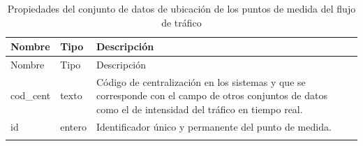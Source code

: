 \documentclass[]{book}
\begin{document}
\begin{longtable}[]{@{}lll@{}}
\caption{\label{tabs:propiedades-datos-localizacion}Propiedades del
conjunto de datos de ubicación de los puntos de medida del flujo de
tráfico}\tabularnewline
\toprule
\begin{minipage}[b]{0.15\columnwidth}\raggedright\strut
Nombre\strut
\end{minipage} & \begin{minipage}[b]{0.11\columnwidth}\raggedright\strut
Tipo\strut
\end{minipage} & \begin{minipage}[b]{0.63\columnwidth}\raggedright\strut
Descripción\strut
\end{minipage}\tabularnewline
\midrule
\endfirsthead
\toprule
\begin{minipage}[b]{0.15\columnwidth}\raggedright\strut
Nombre\strut
\end{minipage} & \begin{minipage}[b]{0.11\columnwidth}\raggedright\strut
Tipo\strut
\end{minipage} & \begin{minipage}[b]{0.63\columnwidth}\raggedright\strut
Descripción\strut
\end{minipage}\tabularnewline
\midrule
\endhead
\begin{minipage}[t]{0.15\columnwidth}\raggedright\strut
cod\_cent\strut
\end{minipage} & \begin{minipage}[t]{0.11\columnwidth}\raggedright\strut
texto\strut
\end{minipage} & \begin{minipage}[t]{0.63\columnwidth}\raggedright\strut
Código de centralización en los sistemas y que se corresponde con el
campo de otros conjuntos de datos como el de intensidad del tráfico en
tiempo real.\strut
\end{minipage}\tabularnewline
\begin{minipage}[t]{0.15\columnwidth}\raggedright\strut
id\strut
\end{minipage} & \begin{minipage}[t]{0.11\columnwidth}\raggedright\strut
entero\strut
\end{minipage} & \begin{minipage}[t]{0.63\columnwidth}\raggedright\strut
Identificador único y permanente del punto de medida.\strut
\end{minipage}\tabularnewline
\begin{minipage}[t]{0.15\columnwidth}\raggedright\strut

\end{minipage}
\end{longtable}
\end{document}
